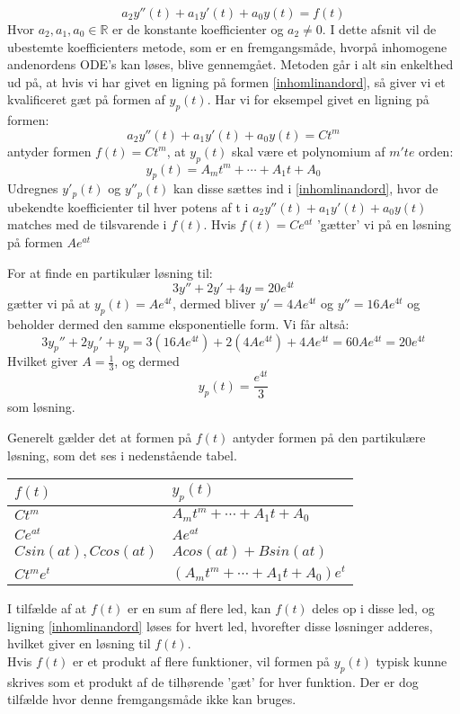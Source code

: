 \begin{equation}
\label{inhomlinandord}
    a_2y''(t)+a_1y'(t)+a_0y(t)=f(t)
\end{equation} \hfill \break
Hvor $a_2,a_1,a_0\in \mathbb{R}$ er de konstante koefficienter og $a_2 \neq 0$. I dette afsnit vil de ubestemte koefficienters metode, som er en fremgangsmåde, hvorpå inhomogene andenordens ODE's kan løses, blive gennemgået.
Metoden går i alt sin enkelthed ud på, at hvis vi har givet en ligning på formen \eqref{inhomlinandord}, så giver vi et kvalificeret gæt på formen af $y_p(t)$. Har vi for eksempel givet en ligning på formen:
\begin{equation*}
    a_2y''(t)+a_1y'(t)+a_0y(t)=Ct^m
\end{equation*} \hfill \break
antyder formen $f(t)=Ct^m$, at $y_p(t)$ skal være et polynomium af $m'te$ orden:
\begin{equation*}
    y_p(t)=A_mt^m+\cdots +A_1t+A_0
\end{equation*} \hfill \break
Udregnes $y'_p(t)$ og $y''_p(t)$ kan disse sættes ind i \ref{inhomlinandord}, hvor de ubekendte koefficienter til hver potens af t i $a_2y''(t)+a_1y'(t)+a_0y(t)$ matches med de tilsvarende i $f(t)$. 
Hvis $f(t)=Ce^{at}$ 'gætter' vi på en løsning på formen $Ae^{at}$
\begin{Example}\hfill \break
\textnormal{For at finde en partikulær løsning til:}\hfill \break
$$3y''+2y'+4y=20e^{4t}$$ \hfill \break
\textnormal{gætter vi på at $y_p(t)=Ae^{4t}$, dermed bliver $y'=4Ae^{4t}$ og $y''=16Ae^{4t}$ og beholder dermed den samme eksponentielle form. Vi får altså:} \hfill \break
$$3y_p''+2y_p'+y_p=3(16Ae^{4t})+2(4Ae^{4t})+4Ae^{4t}=60Ae^ {4t}=20e^{4t}$$ \hfill \break
\textnormal{Hvilket giver $A=\frac{1}{3}$, og dermed} \hfill \break
$$y_p(t)=\frac{e^{4t}}{3}$$ \textnormal{som løsning.}

\end{Example}
Generelt gælder det at formen på $f(t)$ antyder formen på den partikulære løsning, som det ses i nedenstående tabel. 
\begin{table}[H]
    \centering
    \begin{tabular}{|l|l|}
    \hline
       $f(t)$  & $y_p(t)$ \\ \hline
        $Ct^m$ & $A_mt^m+\cdots +A_1t+A_0$ \\ \hline
        $Ce^{at}$ & $Ae^{at}$ \\ \hline
        $C sin(at) , C cos(at)$ & $ A cos(at) + B sin(at)$ \\ \hline
        $Ct^me^t$ & $(A_mt^m+ \cdots +A_1t+A_0)e^t$ \\ \hline
        \end{tabular}
\end{table}
I tilfælde af at $f(t)$ er en sum af flere led, kan $f(t)$ deles op i disse led, og ligning \ref{inhomlinandord} løses for hvert led, hvorefter disse løsninger adderes, hvilket giver en løsning til $f(t)$. \\
Hvis $f(t)$ er et produkt af flere funktioner, vil formen på $y_p(t)$ typisk kunne skrives som et produkt af de tilhørende 'gæt' for hver funktion.
Der er dog tilfælde hvor denne fremgangsmåde ikke kan bruges.

